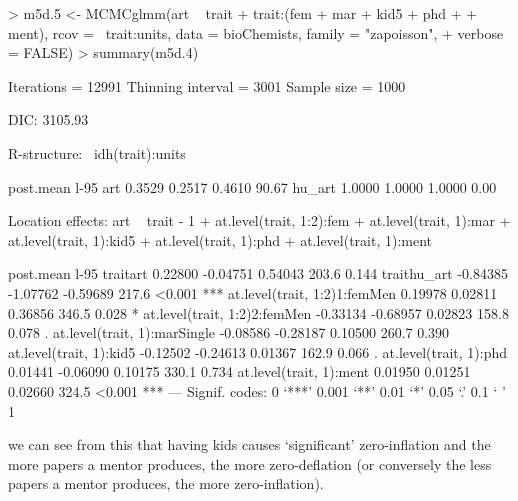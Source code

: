 \documentclass{article}
\begin{document}
\begin{Schunk}
\begin{Sinput}
> m5d.5 <- MCMCglmm(art ~ trait + trait:(fem + mar + kid5 + phd + 
+     ment), rcov = ~trait:units, data = bioChemists, family = "zapoisson", 
+     verbose = FALSE)
> summary(m5d.4)
\end{Sinput}
\begin{Soutput}
 Iterations = 12991
 Thinning interval  = 3001
 Sample size  = 1000 

 DIC: 3105.93 

 R-structure:  ~idh(trait):units

       post.mean l-95%
art       0.3529   0.2517   0.4610    90.67
hu_art    1.0000   1.0000   1.0000     0.00

 Location effects: art ~ trait - 1 + at.level(trait, 1:2):fem + at.level(trait, 1):mar + at.level(trait, 1):kid5 + at.level(trait, 1):phd + at.level(trait, 1):ment 

                             post.mean l-95%
traitart                       0.22800 -0.04751  0.54043    203.6  0.144    
traithu_art                   -0.84385 -1.07762 -0.59689    217.6 <0.001 ***
at.level(trait, 1:2)1:femMen   0.19978  0.02811  0.36856    346.5  0.028 *  
at.level(trait, 1:2)2:femMen  -0.33134 -0.68957  0.02823    158.8  0.078 .  
at.level(trait, 1):marSingle  -0.08586 -0.28187  0.10500    260.7  0.390    
at.level(trait, 1):kid5       -0.12502 -0.24613  0.01367    162.9  0.066 .  
at.level(trait, 1):phd         0.01441 -0.06090  0.10175    330.1  0.734    
at.level(trait, 1):ment        0.01950  0.01251  0.02660    324.5 <0.001 ***
---
Signif. codes:  0 `***' 0.001 `**' 0.01 `*' 0.05 `.' 0.1 ` ' 1 
\end{Soutput}
\end{Schunk}

we can see from this that having kids causes `significant' zero-inflation and the more papers a mentor produces, the more zero-deflation (or conversely the less papers a mentor produces, the more zero-inflation).

\ifalone
\end{document}
